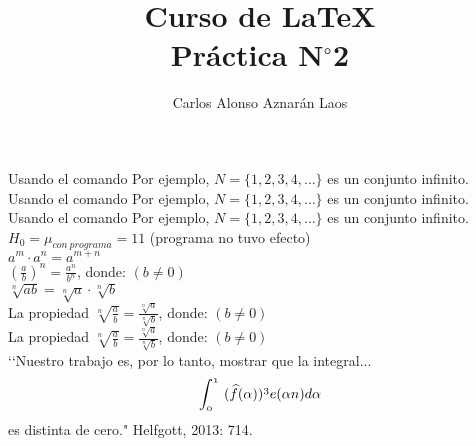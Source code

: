 \documentclass[12pt,a4paper]{article}
\author{Carlos Alonso Aznarán Laos}
\title{Curso de \LaTeX \\ Práctica  N$ ^{\circ}$2}
\begin{document}
\maketitle
\noindent Usando el comando Por ejemplo, $N=\{1, 2, 3, 4, \ldots \}$ es un conjunto infinito.\\
Usando el comando Por ejemplo, \(N=\{1, 2, 3, 4, \ldots \}\) es un conjunto infinito.\\
Usando el comando Por ejemplo,  \begin{math}N=\{1, 2, 3, 4, \ldots \} \end{math} es un conjunto infinito.
\\
$H_0 = \mu_{con\: programa}= 11$ (programa no tuvo efecto)\\
$a^{m}\cdot a^{n} = a^{m+n}$\\
$\left(\frac{a}{b}\right)^{n}=\frac{{a}^{n}} {{b}^{n}}$, donde: $(b\neq0)$\\
$\sqrt[n]{ab} = \sqrt[n]{a}\cdot \sqrt[n]{b}$\\
La propiedad $\sqrt[n]{\frac{a}{b}} = \frac{\sqrt[n]{a}}{\sqrt[n]{b}}$, donde: $(b\neq0)$\\
La propiedad $\displaystyle\sqrt[n]{\frac{a}{b}} = \frac{\sqrt[n]{a}}{\sqrt[n]{b}}$, donde: $(b\neq0)$\\
‘‘Nuestro trabajo es, por lo tanto, mostrar que la integral... \begin{displaymath} \mathnormal{\int_{0}^{1} \,\, (\widehat{f} (\alpha))^{3}e(\alpha n) d \alpha} \end{displaymath} es distinta de cero." Helfgott, 2013: 714.
\end{document}
